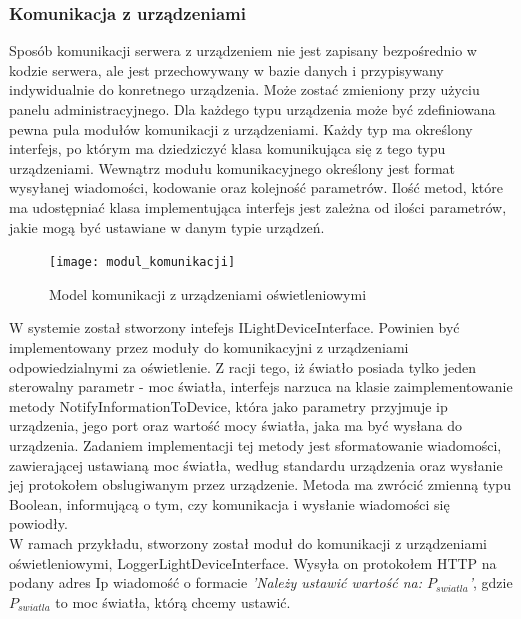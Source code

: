 \subsubsection{Komunikacja z urządzeniami}
Sposób komunikacji serwera z urządzeniem nie jest zapisany bezpośrednio w kodzie serwera, ale jest przechowywany w bazie danych i przypisywany indywidualnie do konretnego urządzenia. Może zostać zmieniony przy użyciu panelu administracyjnego. Dla każdego typu urządzenia może być zdefiniowana pewna pula modułów komunikacji z urządzeniami. Każdy typ ma określony interfejs, po którym ma dziedziczyć klasa komunikująca się z tego typu urządzeniami. Wewnątrz modułu komunikacyjnego określony jest format wysyłanej wiadomości, kodowanie oraz kolejność parametrów. Ilość metod, które ma udostępniać klasa implementująca interfejs jest zależna od ilości parametrów, jakie mogą być ustawiane w danym typie urządzeń.
\begin{figure}[H]			
	\centering
	\caption{Model komunikacji z urządzeniami oświetleniowymi}
	\texttt{[image: modul\_komunikacji]}
\end{figure}
W systemie został stworzony intefejs ILightDeviceInterface. Powinien być implementowany przez moduły do komunikacyjni z urządzeniami odpowiedzialnymi za oświetlenie. Z racji tego, iż światło posiada tylko jeden sterowalny parametr - moc światła, interfejs narzuca na klasie zaimplementowanie metody NotifyInformationToDevice, która jako parametry przyjmuje ip urządzenia, jego port oraz wartość mocy światła, jaka ma być wysłana do urządzenia. Zadaniem implementacji tej metody jest sformatowanie wiadomości, zawierającej ustawianą moc światła, według standardu urządzenia oraz wysłanie jej protokołem obslugiwanym przez urządzenie. Metoda ma zwrócić zmienną typu Boolean, informującą o tym, czy komunikacja i wysłanie wiadomości się powiodły.\\		
W ramach przykładu, stworzony został moduł do komunikacji z urządzeniami oświetleniowymi, LoggerLightDeviceInterface. Wysyła on protokołem HTTP na podany adres Ip wiadomość o formacie \textit{'Należy ustawić wartość na: $P_{swiatla}$'}, gdzie $P_{swiatla}$ to moc światła, którą chcemy ustawić.
